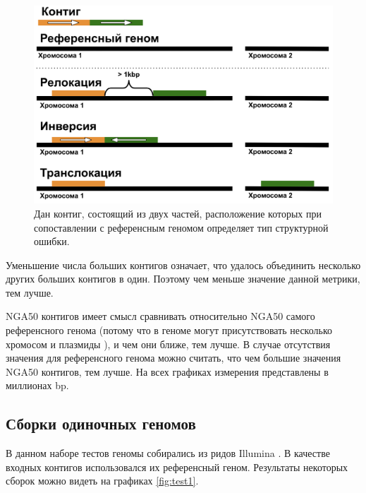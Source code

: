 \documentclass[14pt]{matmex-diploma-custom}
\begin{document}
\begin{figure}[h]
	\centering
	\includegraphics[scale=0.4]{misassemblies.png} 
	\caption{Дан контиг, состоящий из двух частей, расположение которых при сопоставлении с референсным геномом определяет тип структурной ошибки.}
  	\label{fig:miss}
\end{figure}


Уменьшение числа больших контигов означает, что удалось объединить несколько других больших контигов в один. Поэтому чем меньше значение данной метрики, тем лучше.

NGA50 контигов имеет смысл сравнивать относительно NGA50 самого референсного генома (потому что в геноме могут присутствовать несколько хромосом и плазмиды \cite{art:helinski2012plasmids}), и чем они ближе, тем лучше. В случае отсутствия значения для референсного генома можно считать, что чем большие значения NGA50 контигов, тем лучше. На всех графиках измерения представлены в миллионах bp.

\subsection{Сборки одиночных геномов}
В данном наборе тестов геномы собирались из ридов Illumina \cite{art:reads}. В качестве входных контигов использовался их референсный геном. Результаты некоторых сборок можно видеть на графиках \ref{fig:test1}.
\end{document}
